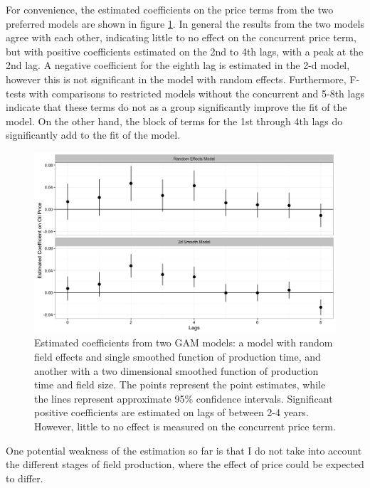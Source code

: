 \documentclass[12pt]{article}
\begin{document}
 
For convenience, the estimated coefficients on the price terms from the two preferred models are shown in figure \ref{price_coefficients}. In general the results from the two models agree with each other, indicating little to no effect on the concurrent price term, but with positive coefficients estimated on the 2nd to 4th lags, with a peak at the 2nd lag. A negative coefficient for the eighth lag is estimated in the 2-d model, however this is not significant in the model with random effects. Furthermore, F-tests with comparisons to restricted models without the concurrent and 5-8th lags indicate that these terms do not as a group significantly improve the fit of the model. On the other hand, the block of terms for the 1st through 4th lags do significantly add to the fit of the model.

\begin{figure}
	\includegraphics[width=1\textwidth]{figures/price_coefficents.png}
	\caption{Estimated coefficients from two GAM models: a model with random field effects and single smoothed function of production time, and another with a two dimensional smoothed function of production time and field size.  The points represent the point estimates, while the lines represent approximate 95\% confidence intervals. Significant positive coefficients are estimated on lags of between 2-4 years.  However, little to no effect is measured on the concurrent price term.}
	\label{price_coefficients}
\end{figure}

One potential weakness of the estimation so far is that I do not take into account the different stages of field production, where the effect of price could be expected to differ. 
\end{document}

